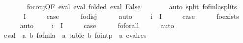 \begin{isabellebody}
\ \ \ \ \ \ \isamarkupfalse%
\ fo{\isacharunderscore}{\kern0pt}conj{\isacharbrackleft}{\kern0pt}OF\ eval{\isasymphi}\ eval{\isasympsi}{\isacharcomma}{\kern0pt}\ folded\ eval{\isacharbrackright}{\kern0pt}\ False\isanewline
\ \ \ \ \ \ \isamarkupfalse%
\ {\isacharparenleft}{\kern0pt}auto\ split{\isacharcolon}{\kern0pt}\ fo{\isacharunderscore}{\kern0pt}fmla{\isachardot}{\kern0pt}splits{\isacharparenright}{\kern0pt}\isanewline
\ \ \isamarkupfalse%
\isanewline
{}\isamarkupfalse%
\isanewline
\ \ \isamarkupfalse%
\ {\isacharparenleft}{\kern0pt}{}\ {\isasymphi}\ {\isasympsi}\ I{\isacharparenright}{\kern0pt}\isanewline
\ \ \isamarkupfalse%
\ \isamarkupfalse%
\ {\isacharquery}{\kern0pt}case\isanewline
\ \ \ \ \isamarkupfalse%
\ fo{\isacharunderscore}{\kern0pt}disj\isanewline
\ \ \ \ \isamarkupfalse%
\ auto\isanewline
{}\isamarkupfalse%
\isanewline
\ \ \isamarkupfalse%
\ {\isacharparenleft}{\kern0pt}{}\ i\ {\isasymphi}\ I{\isacharparenright}{\kern0pt}\isanewline
\ \ \isamarkupfalse%
\ \isamarkupfalse%
\ {\isacharquery}{\kern0pt}case\isanewline
\ \ \ \ \isamarkupfalse%
\ fo{\isacharunderscore}{\kern0pt}exists\isanewline
\ \ \ \ \isamarkupfalse%
\ auto\isanewline
{}\isamarkupfalse%
\isanewline
\ \ \isamarkupfalse%
\ {\isacharparenleft}{\kern0pt}{}\ i\ {\isasymphi}\ I{\isacharparenright}{\kern0pt}\isanewline
\ \ \isamarkupfalse%
\ \isamarkupfalse%
\ {\isacharquery}{\kern0pt}case\isanewline
\ \ \ \ \isamarkupfalse%
\ fo{\isacharunderscore}{\kern0pt}forall\isanewline
\ \ \ \ \isamarkupfalse%
\ auto\isanewline
{}\isamarkupfalse%
%
\endisatagproof
{\isafoldproof}%
%
\isadelimproof
\isanewline
%
\endisadelimproof
\isanewline
{}\isamarkupfalse%
\ eval\ {\isacharcolon}{\kern0pt}{\isacharcolon}{\kern0pt}\ {\isachardoublequoteopen}{\isacharparenleft}{\kern0pt}{\isacharprime}{\kern0pt}a{\isacharcomma}{\kern0pt}\ {\isacharprime}{\kern0pt}b{\isacharparenright}{\kern0pt}\ fo{\isacharunderscore}{\kern0pt}fmla\ {\isasymRightarrow}\ {\isacharparenleft}{\kern0pt}{\isacharprime}{\kern0pt}a\ table{\isacharcomma}{\kern0pt}\ {\isacharprime}{\kern0pt}b{\isacharparenright}{\kern0pt}\ fo{\isacharunderscore}{\kern0pt}intp\ {\isasymRightarrow}\ {\isacharprime}{\kern0pt}a\ eval{\isacharunderscore}{\kern0pt}res{\isachardoublequoteclose}\ \isanewline

\end{isabellebody}
